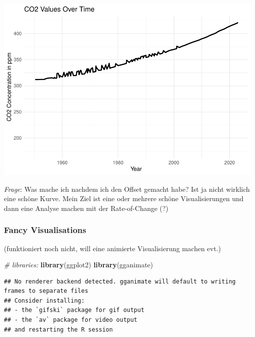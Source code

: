 \documentclass[
]{article}
\newenvironment{Shaded}{\begin{snugshade}}{\end{snugshade}}
\newcommand{\CommentTok}[1]{\textcolor[rgb]{0.56,0.35,0.01}{\textit{#1}}}
\newcommand{\FunctionTok}[1]{\textcolor[rgb]{0.13,0.29,0.53}{\textbf{#1}}}
\newcommand{\NormalTok}[1]{#1}
\begin{document}
\includegraphics{data_wrangling_files/figure-latex/unnamed-chunk-15-2.pdf}

\emph{Frage}: Was mache ich nachdem ich den Offset gemacht habe? Ist ja
nicht wirklich eine schöne Kurve. Mein Ziel ist eine oder mehrere schöne
Visualisierungen und dann eine Analyse machen mit der Rate-of-Change (?)

\hypertarget{fancy-visualisations}{%
\subsubsection{Fancy Visualisations}\label{fancy-visualisations}}

(funktioniert noch nicht, will eine animierte Visualisierung machen
evt.)

\begin{Shaded}
\begin{Highlighting}[]
\CommentTok{\# libraries:}
\FunctionTok{library}\NormalTok{(ggplot2)}
\FunctionTok{library}\NormalTok{(gganimate)}
\end{Highlighting}
\end{Shaded}

\begin{verbatim}
## No renderer backend detected. gganimate will default to writing frames to separate files
## Consider installing:
## - the `gifski` package for gif output
## - the `av` package for video output
## and restarting the R session
\end{verbatim}
\end{document}
